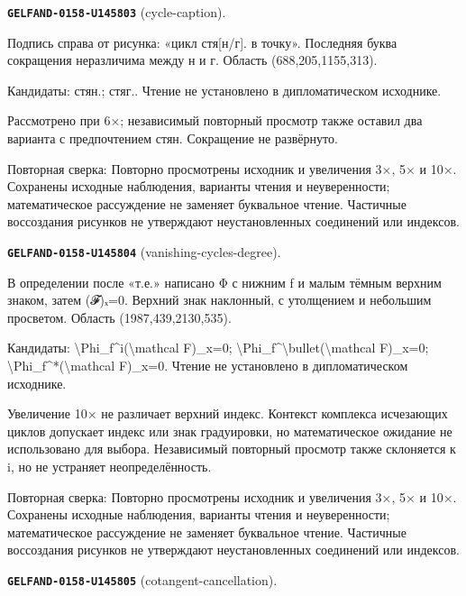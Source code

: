 \par\noindent\leavevmode{}\label{GELFAND-0158-U145803}\label{GELFAND-P001458:cycle-caption}\textbf{\texttt{GELFAND-0158-U145803}} (cycle-caption).\nopagebreak[4]\par
Подпись справа от рисунка: «цикл стя[н/г]. в точку». Последняя буква сокращения неразличима между н и г. Область (688,205,1155,313).\par
Кандидаты: стян.; стяг.. Чтение не установлено в дипломатическом исходнике.\par
Рассмотрено при 6×; независимый повторный просмотр также оставил два варианта с предпочтением стян. Сокращение не развёрнуто.\par
Повторная сверка: Повторно просмотрены исходник и увеличения 3×, 5× и 10×. Сохранены исходные наблюдения, варианты чтения и неуверенности; математическое рассуждение не заменяет буквальное чтение. Частичные воссоздания рисунков не утверждают неустановленных соединений или индексов.\par\medskip
\par\noindent\leavevmode{}\label{GELFAND-0158-U145804}\label{GELFAND-P001458:vanishing-cycles-degree}\textbf{\texttt{GELFAND-0158-U145804}} (vanishing-cycles-degree).\nopagebreak[4]\par
В определении после «т.е.» написано Φ с нижним f и малым тёмным верхним знаком, затем (𝓕)ₓ=0. Верхний знак наклонный, с утолщением и небольшим просветом. Область (1987,439,2130,535).\par
Кандидаты: \textbackslash{}Phi\_f\textasciicircum{}i(\textbackslash{}mathcal F)\_x=0; \textbackslash{}Phi\_f\textasciicircum{}\textbackslash{}bullet(\textbackslash{}mathcal F)\_x=0; \textbackslash{}Phi\_f\textasciicircum{}*(\textbackslash{}mathcal F)\_x=0. Чтение не установлено в дипломатическом исходнике.\par
Увеличение 10× не различает верхний индекс. Контекст комплекса исчезающих циклов допускает индекс или знак градуировки, но математическое ожидание не использовано для выбора. Независимый повторный просмотр также склоняется к i, но не устраняет неопределённость.\par
Повторная сверка: Повторно просмотрены исходник и увеличения 3×, 5× и 10×. Сохранены исходные наблюдения, варианты чтения и неуверенности; математическое рассуждение не заменяет буквальное чтение. Частичные воссоздания рисунков не утверждают неустановленных соединений или индексов.\par\medskip
\par\noindent\leavevmode{}\label{GELFAND-0158-U145805}\label{GELFAND-P001458:cotangent-cancellation}\textbf{\texttt{GELFAND-0158-U145805}} (cotangent-cancellation).\nopagebreak[4]\par
